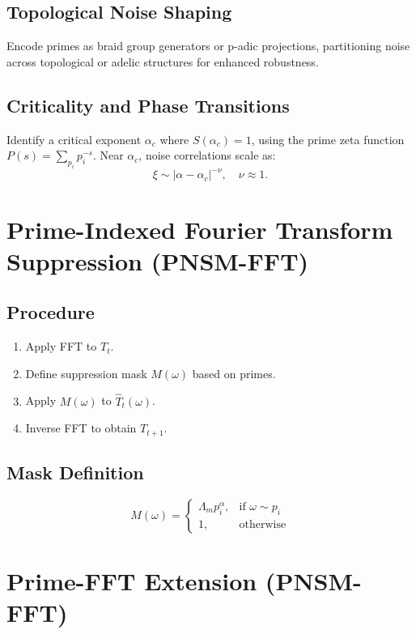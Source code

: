 \documentclass{article}
\theoremstyle{plain}
\begin{document}
\subsection{Topological Noise Shaping}
Encode primes as braid group generators or p-adic projections, partitioning noise across topological or adelic structures for enhanced robustness.

\subsection{Criticality and Phase Transitions}
Identify a critical exponent \( \alpha_c \) where \( S(\alpha_c) = 1 \), using the prime zeta function \( P(s) = \sum_{p_i} p_i^{-s} \). Near \( \alpha_c \), noise correlations scale as:
\begin{equation}
    \xi \sim |\alpha - \alpha_c|^{-\nu}, \quad \nu \approx 1.
\end{equation}



\section{Prime-Indexed Fourier Transform Suppression (PNSM-FFT)}

\subsection{Procedure}
\begin{enumerate}
    \item Apply FFT to $T_t$.
    \item Define suppression mask $M(\omega)$ based on primes.
    \item Apply $M(\omega)$ to $\widehat{T}_t(\omega)$.
    \item Inverse FFT to obtain $T_{t+1}$.
\end{enumerate}

\subsection{Mask Definition}
\begin{equation}
M(\omega) = \begin{cases}
\Lambda_m p_i^\alpha, & \text{if } \omega \sim p_i \\
1, & \text{otherwise}
\end{cases}
\end{equation}

\section{Prime-FFT Extension (PNSM-FFT)}
\end{document}
